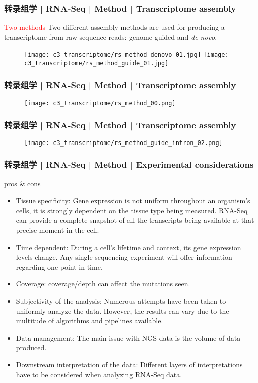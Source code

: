 \begin{frame}
  \frametitle{转录组学 | RNA-Seq | Method | Transcriptome assembly}
  \begin{block}{\textcolor{red}{Two methods}}
    Two different assembly methods are used for producing a transcriptome from raw sequence reads: genome-guided and \textit{de-novo}.
  \end{block}
  \begin{figure}
    \centering
    \texttt{[image: c3\_transcriptome/rs\_method\_denovo\_01.jpg]} \quad
    \texttt{[image: c3\_transcriptome/rs\_method\_guide\_01.jpg]}
  \end{figure}
\end{frame}

\begin{frame}
  \frametitle{转录组学 | RNA-Seq | Method | Transcriptome assembly}
  \begin{figure}
    \centering
    \texttt{[image: c3\_transcriptome/rs\_method\_00.png]}
  \end{figure}
\end{frame}

\begin{frame}
  \frametitle{转录组学 | RNA-Seq | Method | Transcriptome assembly}
  \begin{figure}
    \centering
    \texttt{[image: c3\_transcriptome/rs\_method\_guide\_intron\_02.png]}
  \end{figure}
\end{frame}

\begin{frame}
  \frametitle{转录组学 | RNA-Seq | Method | Experimental considerations}
  {\footnotesize
  \begin{block}{pros \& cons}
    \begin{itemize}
      \item Tissue specificity: Gene expression is not uniform throughout an organism's cells, it is strongly dependent on the tissue type being measured. RNA-Seq can provide a complete snapshot of all the transcripts being available at that precise moment in the cell.
      \item Time dependent: During a cell's lifetime and context, its gene expression levels change. Any single sequencing experiment will offer information regarding one point in time.
      \item Coverage: coverage/depth can affect the mutations seen.
      \item Subjectivity of the analysis: Numerous attempts have been taken to uniformly analyze the data. However, the results can vary due to the multitude of algorithms and pipelines available.
      \item Data management: The main issue with NGS data is the volume of data produced.
      \item Downstream interpretation of the data: Different layers of interpretations have to be considered when analyzing RNA-Seq data.
    \end{itemize}
  \end{block}
  }
\end{frame}

